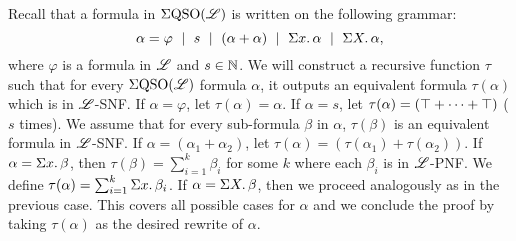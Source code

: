 Recall that a formula in $\Sigma{\rm QSO}(\mathscr{L})$ is written on the following grammar:
\[
\alpha = \varphi \ \mid \ s \ \mid \ (\alpha + \alpha) \ \mid \ \Sigma{x}.\, \alpha \ \mid \ \Sigma{X}.\, \alpha,
\]
where $\varphi$ is a formula in $\mathscr{L}$ and $s\in\mathbb{N}$. We will construct a recursive function $\tau$ such that for every $\Sigma{\rm QSO}(\mathscr{L})$ formula $\alpha$, it outputs an equivalent formula $\tau(\alpha)$ which is in $\mathscr{L}$-SNF. If $\alpha = \varphi$, let $\tau(\alpha) = \alpha$. If $\alpha = s$, let $\tau(\alpha) = (\top + \cdots + \top)$ ($s$ times). We assume that for every sub-formula $\beta$ in $\alpha$, $\tau(\beta)$ is an equivalent formula in $\mathscr{L}$-SNF. If $\alpha = (\alpha_1 + \alpha_2)$, let $\tau(\alpha) = (\tau(\alpha_1) + \tau(\alpha_2))$. If $\alpha = \Sigma{x}.\,\beta$, then $\tau(\beta) = \sum_{i = 1}^{k}\beta_i$ for some $k$ where each $\beta_i$ is in $\mathscr{L}$-PNF. We define $\tau(\alpha) = \sum_{i = 1}^{k}\Sigma{x}.\,\beta_i$. If $\alpha = \Sigma{X}.\,\beta$, then we proceed analogously as in the previous case. This covers all possible cases for $\alpha$ and we conclude the proof by taking $\tau(\alpha)$ as the desired rewrite of $\alpha$.